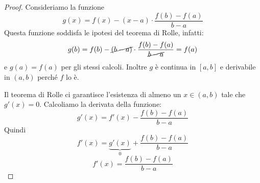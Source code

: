 \begin{proof}
Consideriamo la funzione
\begin{equation*}
g(x) = f(x) - (x-a) \cdot \frac{f(b)-f(a)}{b-a}
\end{equation*}
Questa funzione soddisfa le ipotesi del teorema di Rolle, infatti:
\begin{equation*}
g(b) = f(b) - \cancel{(b-a)} \cdot \frac{f(b)-f(a)}{\cancel{b-a}} = f(a)
\end{equation*} 
e $g(a) = f(a)$ per gli stessi calcoli. Inoltre $g$ è continua in $[a,b]$ e derivabile in $(a,b)$ perché $f$ lo è.

Il teorema di Rolle ci garantisce l'esistenza di almeno un $x \in (a,b)$ tale che $g'(x)=0$. Calcoliamo la derivata della funzione:
\begin{equation*}
g'(x) = f'(x) - \frac{f(b)-f(a)}{b-a}
\end{equation*}
Quindi
\begin{equation*}
f'(x) = \underbrace{g'(x)}_{0} + \frac{f(b)-f(a)}{b-a}
\end{equation*}
\begin{equation*}
f'(x) = \frac{f(b)-f(a)}{b-a}
\end{equation*}
\end{proof}
